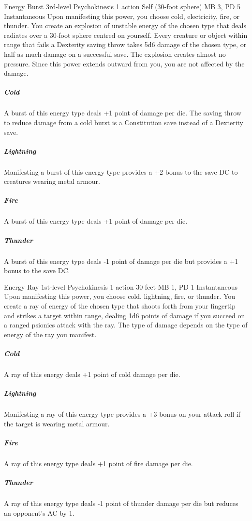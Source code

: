 \DndPowerHeader%
  {Energy Burst}
  {3rd-level Psychokinesis}
  {1 action}
  {Self (30-foot sphere)}
  {MB 3, PD 5}
  {Instantaneous}
Upon manifesting this power, you choose cold, electricity,
fire, or thunder.
You create an explosion of unstable energy of the chosen type
that deals radiates over a 30-foot sphere
centred on yourself.
Every creature or object within range that fails a Dexterity saving throw
takes 5d6 damage of the chosen type, or
half as much damage on a successful save.
The explosion creates almost no pressure.
Since this power extends outward from you,
you are not affected by the damage.

  \subparagraph{Cold}
  A burst of this energy type deals +1 point of damage per die.
  The saving throw to reduce damage from a cold burst
  is a Constitution save instead of a Dexterity save.
  
  \subparagraph{Lightning}
  Manifesting a burst of this energy type provides a +2 bonus
  to the save DC to creatures wearing metal armour.
  
  \subparagraph{Fire}
  A burst of this energy type deals +1 point of damage per die.
  
  \subparagraph{Thunder}
    A burst of this energy type deals -1 point of damage per die
    but provides a +1 bonus to the save DC.

\DndPowerHeader%
  {Energy Ray}
  {1st-level Psychokinesis}
  {1 action}
  {30 feet}
  {MB 1, PD 1}
  {Instantaneous}
Upon manifesting this power,
you choose cold, lightning, fire, or thunder.
You create a ray of energy of the chosen type that
shoots forth from your fingertip and strikes a target within range,
dealing 1d6 points of damage if you succeed on a
ranged psionics attack with the ray.
The type of damage depends on
the type of energy of the ray you manifest. 
  \subparagraph{Cold}
    A ray of this energy deals +1 point of cold damage per die.
  \subparagraph{Lightning}
    Manifesting a ray of this energy type provides a
    +3 bonus on your attack roll if the target is wearing metal armour.
  \subparagraph{Fire}
    A ray of this energy type deals +1 point of fire damage per die.
  \subparagraph{Thunder}
    A ray of this energy type deals -1 point of thunder damage per die
    but reduces an opponent's AC by 1.

